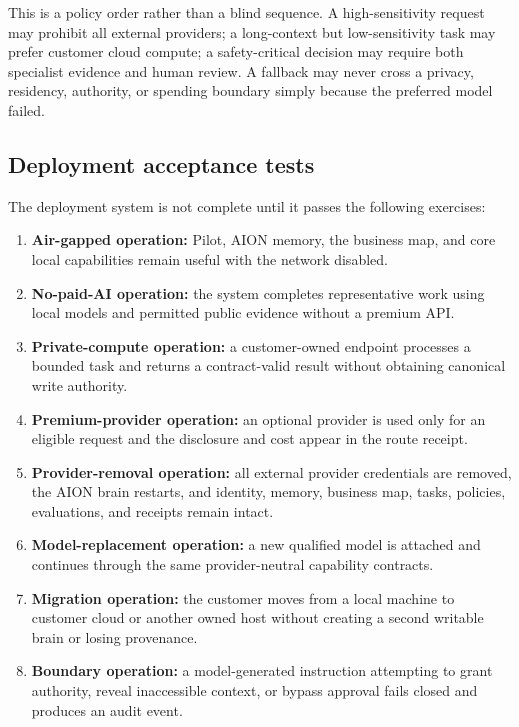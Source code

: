 This is a policy order rather than a blind sequence.  A high-sensitivity request
may prohibit all external providers; a long-context but low-sensitivity task may
prefer customer cloud compute; a safety-critical decision may require both
specialist evidence and human review.  A fallback may never cross a privacy,
residency, authority, or spending boundary simply because the preferred model
failed.

\subsection{Deployment acceptance tests}

The deployment system is not complete until it passes the following exercises:

\begin{enumerate}
  \item \textbf{Air-gapped operation:} Pilot, AION memory, the business map, and
        core local capabilities remain useful with the network disabled.
  \item \textbf{No-paid-AI operation:} the system completes representative work
        using local models and permitted public evidence without a premium API.
  \item \textbf{Private-compute operation:} a customer-owned endpoint processes
        a bounded task and returns a contract-valid result without obtaining
        canonical write authority.
  \item \textbf{Premium-provider operation:} an optional provider is used only
        for an eligible request and the disclosure and cost appear in the route
        receipt.
  \item \textbf{Provider-removal operation:} all external provider credentials
        are removed, the AION brain restarts, and identity, memory, business map,
        tasks, policies, evaluations, and receipts remain intact.
  \item \textbf{Model-replacement operation:} a new qualified model is attached
        and continues through the same provider-neutral capability contracts.
  \item \textbf{Migration operation:} the customer moves from a local machine to
        customer cloud or another owned host without creating a second writable
        brain or losing provenance.
  \item \textbf{Boundary operation:} a model-generated instruction attempting to
        grant authority, reveal inaccessible context, or bypass approval fails
        closed and produces an audit event.
\end{enumerate}

